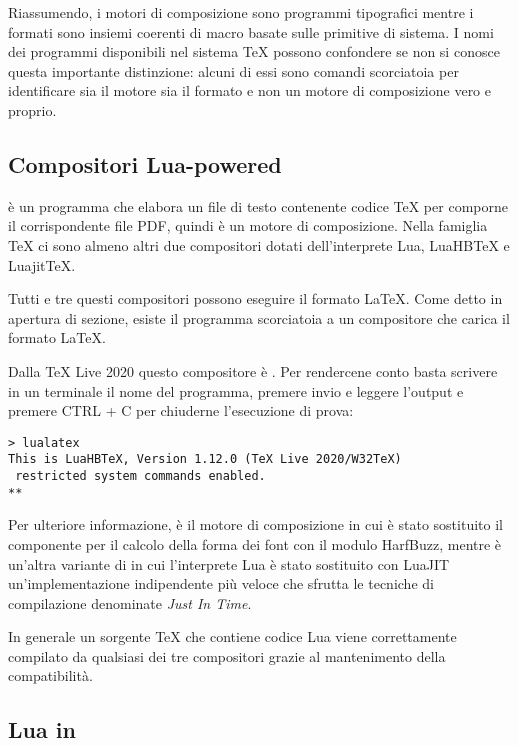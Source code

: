 Riassumendo, i motori di composizione sono programmi tipografici mentre i
formati sono insiemi coerenti di macro basate sulle primitive di sistema. I
nomi dei programmi disponibili nel sistema \TeX{} possono confondere se non si
conosce questa importante distinzione: alcuni di essi sono comandi scorciatoia
per identificare sia il motore sia il formato e non un motore di composizione
vero e proprio.


\subsection{Compositori Lua-powered}

\LuaTeX{} è un programma che elabora un file di testo contenente codice \TeX{}
per comporne il corrispondente file PDF, quindi è un motore di composizione.
Nella famiglia \TeX{} ci sono almeno altri due compositori dotati
dell'interprete Lua, LuaHB\TeX{} e Luajit\TeX{}.

Tutti e tre questi compositori possono eseguire il formato \LaTeX. Come detto in
apertura di sezione, esiste il programma  scorciatoia a un
compositore che carica il formato \LaTeX.

Dalla TeX Live 2020 questo compositore è . Per rendercene conto
basta scrivere in un terminale il nome del programma, premere invio e leggere
l'output e premere CTRL + C per chiuderne l'esecuzione di prova:
\begin{Verbatim}
> lualatex
This is LuaHBTeX, Version 1.12.0 (TeX Live 2020/W32TeX)
 restricted system commands enabled.
**
\end{Verbatim}

Per ulteriore informazione,  è il motore di composizione
 in cui è stato sostituito il componente per il calcolo della
forma dei font con il modulo HarfBuzz, mentre  è un'altra
variante di  in cui l'interprete Lua è stato sostituito con
LuaJIT un'implementazione indipendente più veloce che sfrutta le tecniche di
compilazione denominate \emph{Just In Time}.

In generale un sorgente \TeX{} che contiene codice Lua viene correttamente
compilato da qualsiasi dei tre compositori grazie al mantenimento della
compatibilità.


\subsection{Lua in \LuaTeX}

